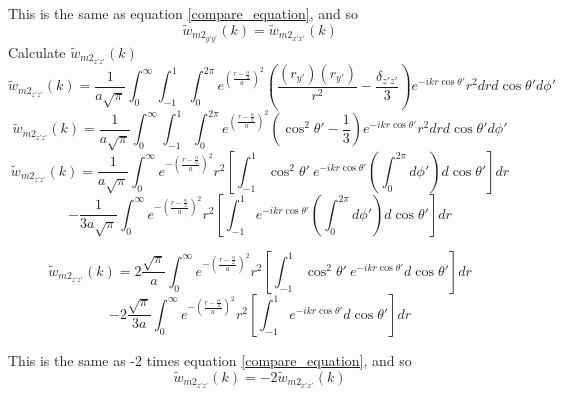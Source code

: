 \documentclass[letterpaper,twocolumn,amsmath,amssymb,prb]{revtex4-1}
\begin{document}
\begin{widetext}
This is the same as equation \ref{compare_equation}, and so \begin{equation}{\widetilde{w}_{{m2}_{y'y'}}(k)=\widetilde{w}_{{m2}_{x'x'}}(k)}\end{equation}
Calculate $\widetilde{w}_{{m2}_{z'z'}}(k)$ 
\begin{equation}{\widetilde{w}_{{m2}_{z'z'}}(k)=\frac{1}{a\sqrt{\pi}}\int_{0}^{\infty}\int_{-1}^{1}\int_{0}^{2\pi}e^{\left(\frac{r-\frac{\alpha}{2}}{a}\right)^2}\left(\frac{(r_{y'})(r_{y'})}{r^2}-\frac{\delta_{z'z'}}{3}\right)e^{-ikr\cos\theta'}r^2d{r}d{\cos\theta'}d{\phi'}}\end{equation}
\begin{equation}{\widetilde{w}_{{m2}_{z'z'}}(k)=\frac{1}{a\sqrt{\pi}}\int_{0}^{\infty}\int_{-1}^{1}\int_{0}^{2\pi}e^{\left(\frac{r-\frac{\alpha}{2}}{a}\right)^2}\left(\cos^2\theta'-\frac{1}{3}\right)e^{-ikr\cos\theta'}r^2d{r}d{\cos\theta'}d{\phi'}}\end{equation}
\[{}\]
\begin{displaymath}{\widetilde{w}_{{m2}_{z'z'}}(k)=\frac{1}{a\sqrt{\pi}}\int_{0}^{\infty}e^{-\left(\frac{r-\frac{\alpha}{2}}{a}\right)^2}r^2\left[\int_{-1}^{1}\cos^2\theta'~e^{-ikr\cos\theta'}\left(\int_{0}^{2\pi}d{\phi'}\right)d{\cos\theta'}\right]d{r}}\end{displaymath} 
\begin{equation}{-\frac{1}{3a\sqrt{\pi}}\int_{0}^{\infty}e^{-\left(\frac{r-\frac{\alpha}{2}}{a}\right)^2}r^2\left[\int_{-1}^{1}e^{-ikr\cos\theta'}\left(\int_{0}^{2\pi}d{\phi'}\right)d{\cos\theta'}\right]d{r}}\end{equation}

\color{blue}
\begin{displaymath}{\widetilde{w}_{{m2}_{z'z'}}(k)=2\frac{\sqrt{\pi}}{a}\int_{0}^{\infty}e^{-\left(\frac{r-\frac{\alpha}{2}}{a}\right)^2}r^2\left[\int_{-1}^{1}\cos^2\theta'~e^{-ikr\cos\theta'}d{\cos\theta'}\right]d{r}}\end{displaymath} 
\begin{equation}{-2\frac{\sqrt{\pi}}{3a}\int_{0}^{\infty}e^{-\left(\frac{r-\frac{\alpha}{2}}{a}\right)^2}r^2\left[\int_{-1}^{1}e^{-ikr\cos\theta'}d{\cos\theta'}\right]d{r}}\end{equation}
\color{black} 




This is the same as -2 times equation \ref{compare_equation}, and so \begin{equation}{\widetilde{w}_{{m2}_{z'z'}}(k)=-2\widetilde{w}_{{m2}_{x'x'}}(k)}\end{equation}
\[{}\]

\end{widetext}
\end{document}
